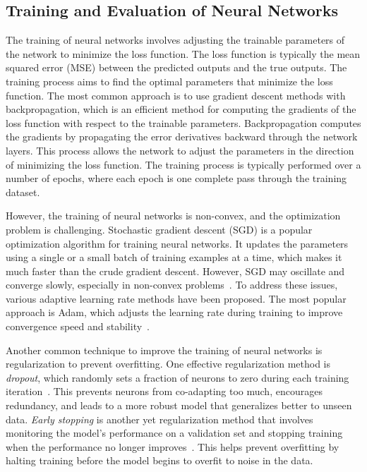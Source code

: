 \subsection{Training and Evaluation of Neural Networks}

The training of neural networks involves adjusting the trainable parameters of the network to minimize the loss function.
The loss function is typically the mean squared error (MSE) between the predicted outputs and the true outputs.
The training process aims to find the optimal parameters that minimize the loss function.
The most common approach is to use gradient descent methods with backpropagation, which is an efficient method for computing the gradients of the loss function with respect to the trainable parameters.
Backpropagation computes the gradients by propagating the error derivatives backward through the network layers.
This process allows the network to adjust the parameters in the direction of minimizing the loss function.
The training process is typically performed over a number of epochs, where each epoch is one complete pass through the training dataset.

However, the training of neural networks is non-convex, and the optimization problem is challenging.
Stochastic gradient descent (SGD) is a popular optimization algorithm for training neural networks.
It updates the parameters using a single or a small batch of training examples at a time, which makes it much faster than the crude gradient descent.
However, SGD may oscillate and converge slowly, especially in non-convex problems~\citep{bengio2016}.
To address these issues, various adaptive learning rate methods have been proposed.
The most popular approach is Adam, which adjusts the learning rate during training to improve convergence speed and stability~\citep{kingma2014adam}.

Another common technique to improve the training of neural networks is regularization to prevent overfitting.
One effective regularization method is \textit{dropout}, which randomly sets a fraction of neurons to zero during each training iteration~\citep{srivastava2014dropout}.
This prevents neurons from co-adapting too much, encourages redundancy, and leads to a more robust model that generalizes better to unseen data.
\textit{Early stopping} is another yet regularization method that involves monitoring the model's performance on a validation set and stopping training when the performance no longer improves~\citep{prechelt2002early}.
This helps prevent overfitting by halting training before the model begins to overfit to noise in the data.

